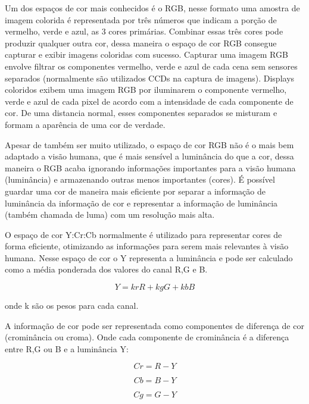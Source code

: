 Um dos espaços de cor mais conhecidos é o RGB, nesse formato uma amostra de imagem colorida é representada por três números que indicam a porção de vermelho, verde e azul, as 3 cores primárias. Combinar essas três cores pode produzir qualquer outra cor, dessa maneira o espaço de cor RGB consegue capturar e exibir imagens coloridas com sucesso. Capturar uma imagem RGB envolve filtrar os componentes vermelho, verde e azul de cada cena sem sensores separados (normalmente são utilizados CCDs na captura de imagens). Displays coloridos exibem uma imagem RGB por iluminarem o componente vermelho, verde e azul de cada pixel de acordo com a intensidade de cada componente de cor. De uma distancia normal, esses componentes separados se misturam e formam a aparência de uma cor de verdade.

Apesar de também ser muito utilizado, o espaço de cor RGB não é o mais bem adaptado a visão humana, que é mais sensível a luminância do que a cor, dessa maneira o RGB acaba ignorando informações importantes para a visão humana (luminância) e armazenando outras menos importantes (cores). É possível guardar uma cor de maneira mais eficiente por separar a informação de luminância da informação de cor e representar a informação de luminância (também chamada de luma) com um resolução mais alta.

O espaço de cor Y:Cr:Cb normalmente é utilizado para representar cores de forma eficiente, otimizando as informações para serem mais relevantes à visão humana. Nesse espaço de cor o Y representa a luminância e pode ser calculado como a média ponderada dos valores do canal R,G e B.

\begin{equation}
Y = krR + kgG + kbB
\end{equation} 

onde k são os pesos para cada canal.

A informação de cor pode ser representada como componentes de diferença de cor (crominância ou croma). Onde cada componente de crominância é a diferença entre R,G ou B e a luminância Y:

\begin{equation}
Cr = R - Y
\end{equation}

\begin{equation}
Cb = B - Y
\end{equation}

\begin{equation}
Cg = G - Y
\end{equation}



